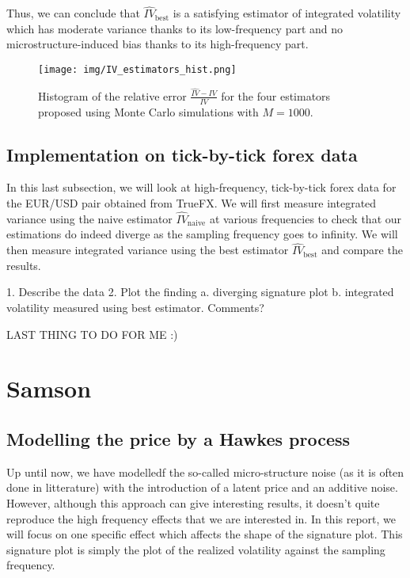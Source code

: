 \documentclass[a4paper,12pt,twoside]{article}
\begin{document}
Thus, we can conclude that $\hat{IV}_\text{best}$ is a satisfying estimator of integrated volatility which has moderate variance thanks to its low-frequency part and no microstructure-induced bias thanks to its high-frequency part.

\begin{figure}[h]
    \centering
    \texttt{[image: img/IV\_estimators\_hist.png]}
    \caption{Histogram of the relative error $\frac{\hat{IV}-IV}{IV}$ for the four estimators proposed using Monte Carlo simulations with $M=1000$.}
    \label{fig-hists}
\end{figure}

\subsection{Implementation on tick-by-tick forex data}
In this last subsection, we will look at high-frequency, tick-by-tick forex data for the EUR/USD pair obtained from TrueFX. We will first measure integrated variance using the naive estimator $\hat{IV}_\text{naive}$ at various frequencies to check that our estimations do indeed diverge as the sampling frequency goes to infinity. We will then measure integrated variance using the best estimator $\hat{IV}_\text{best}$ and compare the results.

1. Describe the data
2. Plot the finding
a. diverging signature plot
b. integrated volatility measured using best estimator. Comments?

LAST THING TO DO FOR ME :)


\section{Samson} \label{section-samson}
\subsection{Modelling the price by a Hawkes process}

Up until now, we have modelledf the so-called micro-structure noise (as it is often done in litterature) with the introduction of a latent price and an additive noise. 
However, although this approach can give interesting results, it doesn't quite reproduce the high frequency effects that we are interested in. In this report, we will focus on one specific effect which affects the shape of the signature plot. This signature plot is simply the plot of the realized volatility against the sampling frequency.
\end{document}
